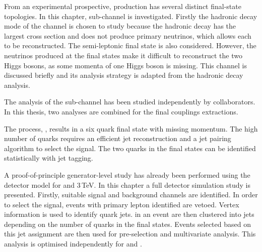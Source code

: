 
From an experimental prospective, \eeToHH production has several distinct final-state topologies. In this chapter, \eeToHHbbWW sub-channel  is investigated. Firstly the hadronic decay mode of the \eeToHHbbWW channel is chosen to study because the hadronic decay has the largest cross section and does not produce primary neutrinos, which allows each \PW to be reconstructed. The semi-leptonic final state is also considered. However, the neutrinos produced at the final states make it  difficult to reconstruct the two Higgs bosons, as some momenta of one Higgs boson is missing. This channel is discussed briefly and its analysis strategy is adapted from the hadronic decay analysis.


The analysis of the \eeToHHbbbb  sub-channel has been studied independently by collaborators. In this thesis, two analyses are combined for the final couplings extractions.


The process, \eeToHHbbWWHadFull, results in a six quark final state with missing momentum. The high number of quarks requires an efficient jet reconstruction and a jet pairing algorithm to select the signal. The two \Pbottom quarks in the final states can be identified statistically with \Pbottom jet tagging. %

A proof-of-principle generator-level study has already been performed using the \CLICILD detector model for  and 3\,TeV\cite{Linssen:2012hp}. In this chapter a full \CLICILD detector simulation study is presented. Firstly, suitable signal and background channels are identified. In order to select the signal, events with primary lepton identified are vetoed.  Vertex information is used to identify \Pbottom quark jets. \PFOs in an event are then clustered into jets depending on the number of quarks in the final states. Events selected based on this jet assignment are then used for pre-selection and multivariate analysis. This analysis is optimised independently for  and .

